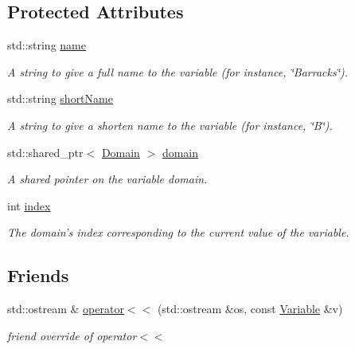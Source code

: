 \subsection*{Protected Attributes}
\begin{DoxyCompactItemize}
\item 
std\-::string \hyperlink{classghost_1_1Variable_a0f9fbecc12e22224c65ed6d8ce4cb507}{name}
\begin{DoxyCompactList}\small\item\em A string to give a full name to the variable (for instance, \char`\"{}\-Barracks\char`\"{}). \end{DoxyCompactList}\item 
std\-::string \hyperlink{classghost_1_1Variable_af0a8a6632b981ae0ff22cf4dc62495d3}{short\-Name}
\begin{DoxyCompactList}\small\item\em A string to give a shorten name to the variable (for instance, \char`\"{}\-B\char`\"{}). \end{DoxyCompactList}\item 
std\-::shared\-\_\-ptr$<$ \hyperlink{classghost_1_1Domain}{Domain} $>$ \hyperlink{classghost_1_1Variable_a59a5fc42a83c3dd5504daa72f5191469}{domain}
\begin{DoxyCompactList}\small\item\em A shared pointer on the variable domain. \end{DoxyCompactList}\item 
int \hyperlink{classghost_1_1Variable_a934efa463fb1897b4266040e321dbc41}{index}
\begin{DoxyCompactList}\small\item\em The domain's index corresponding to the current value of the variable. \end{DoxyCompactList}\end{DoxyCompactItemize}
\subsection*{Friends}
\begin{DoxyCompactItemize}
\item 
std\-::ostream \& \hyperlink{classghost_1_1Variable_aab05ab0693334e9e9a39f43903a37cb7}{operator$<$$<$} (std\-::ostream \&os, const \hyperlink{classghost_1_1Variable}{Variable} \&v)
\begin{DoxyCompactList}\small\item\em friend override of operator$<$$<$ \end{DoxyCompactList}\end{DoxyCompactItemize}


